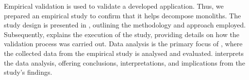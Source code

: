 Empirical validation is used to validate a developed application. Thus, we
prepared an empirical study to confirm that it helps decompose monoliths. The
study design is presented in , outlining the methodology and
approach employed. Subsequently,  explains the execution of
the study, providing details on how the validation process was carried out.
Data analysis is the primary focus of , where the collected
data from the empirical study is analysed and evaluated.
 interprets the data analysis, offering conclusions,
interpretations, and implications from the study's findings.
